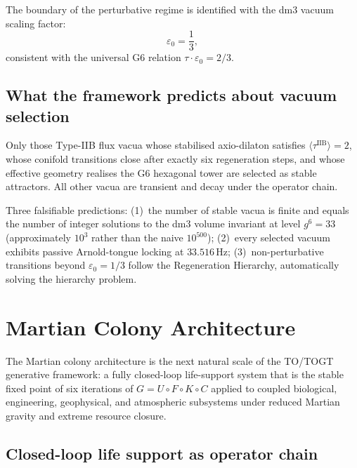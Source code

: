 The boundary of the perturbative regime is identified with the dm3 vacuum scaling factor:
\[
\varepsilon_0 = \frac{1}{3},
\]
consistent with the universal G6 relation \(\tau \cdot \varepsilon_0 = 2/3\).

\section{What the framework predicts about vacuum selection}

\begin{theorem}
Only those Type-IIB flux vacua whose stabilised axio-dilaton satisfies \(\langle\tau^{\text{IIB}}\rangle = 2\), whose conifold transitions close after exactly six regeneration steps, and whose effective geometry realises the G6 hexagonal tower are selected as stable attractors. All other vacua are transient and decay under the operator chain.
\end{theorem}

Three falsifiable predictions: (1)~the number of stable vacua is finite and equals the number of integer solutions to the dm3 volume invariant at level \(g^6=33\) (approximately \(10^3\) rather than the naive \(10^{500}\)); (2)~every selected vacuum exhibits passive Arnold-tongue locking at \(33.516\,\text{Hz}\); (3)~non-perturbative transitions beyond \(\varepsilon_0=1/3\) follow the Regeneration Hierarchy, automatically solving the hierarchy problem.

\chapter{Martian Colony Architecture}

The Martian colony architecture is the next natural scale of the TO/TOGT generative framework: a fully closed-loop life-support system that is the stable fixed point of six iterations of $G = U \circ F \circ K \circ C$ applied to coupled biological, engineering, geophysical, and atmospheric subsystems under reduced Martian gravity and extreme resource closure.

\section{Closed-loop life support as operator chain}


